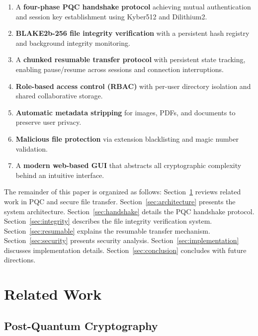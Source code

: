 \documentclass[12pt, a4paper]{article}
\begin{document}
\begin{enumerate}[label=\arabic*., itemsep=2pt]
    \item A \textbf{four-phase PQC handshake protocol} achieving mutual authentication and session key establishment using Kyber512 and Dilithium2.
    \item \textbf{BLAKE2b-256 file integrity verification} with a persistent hash registry and background integrity monitoring.
    \item A \textbf{chunked resumable transfer protocol} with persistent state tracking, enabling pause/resume across sessions and connection interruptions.
    \item \textbf{Role-based access control (RBAC)} with per-user directory isolation and shared collaborative storage.
    \item \textbf{Automatic metadata stripping} for images, PDFs, and documents to preserve user privacy.
    \item \textbf{Malicious file protection} via extension blacklisting and magic number validation.
    \item A \textbf{modern web-based GUI} that abstracts all cryptographic complexity behind an intuitive interface.
\end{enumerate}

The remainder of this paper is organized as follows: Section~\ref{sec:related} reviews related work in PQC and secure file transfer. Section~\ref{sec:architecture} presents the system architecture. Section~\ref{sec:handshake} details the PQC handshake protocol. Section~\ref{sec:integrity} describes the file integrity verification system. Section~\ref{sec:resumable} explains the resumable transfer mechanism. Section~\ref{sec:security} presents security analysis. Section~\ref{sec:implementation} discusses implementation details. Section~\ref{sec:conclusion} concludes with future directions.

\section{Related Work}
\label{sec:related}

\subsection{Post-Quantum Cryptography}
\end{document}

